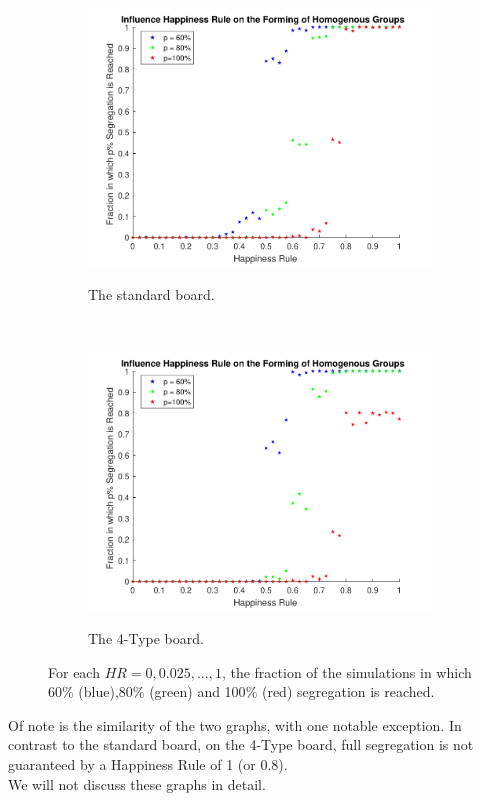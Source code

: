 \begin{figure}[H]
	\begin{subfigure}{0.4\textwidth}
    \centering
    \includegraphics[width=\textwidth]{happy_segr_60_80_100.pdf}
    \label{fig:happysegsc}
    \caption{The standard board.}
    \end{subfigure}
    ~
    \begin{subfigure}{0.4\textwidth}
    \centering
    \includegraphics[width=\textwidth]{happy_segr_60_80_100_4b.pdf}
    \label{fig:happyseg4c}
    \caption{The 4-Type board.}
    \end{subfigure}
    \caption{For each $HR = 0,0.025,...,1$, the fraction of the simulations in which 60$\%$ (blue),80$\%$ (green) and 100$\%$ (red) segregation is reached.}
    \label{fig:happysegr}
\end{figure}
Of note is the similarity of the two graphs, with one notable exception. In contrast to the standard board, on the 4-Type board, full segregation is not guaranteed by a Happiness Rule of 1 (or 0.8).\\
We will not discuss these graphs in detail.

